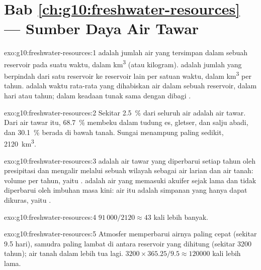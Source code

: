 \section*{Bab \ref{ch:g10:freshwater-resources} --- Sumber Daya Air Tawar}

\begin{solution}{exo:g10:freshwater-resources:1}
 adalah jumlah air yang tersimpan dalam sebuah reservoir pada suatu waktu,
dalam \unit{km^3} (atau kilogram).  adalah jumlah yang berpindah dari satu
reservoir ke reservoir lain per satuan waktu, dalam \unit{km^3} per tahun.
 adalah waktu rata-rata yang dihabiskan air dalam sebuah
reservoir, dalam hari atau tahun; dalam keadaan tunak  sama
dengan  dibagi .
\end{solution}

\begin{solution}{exo:g10:freshwater-resources:2}
Sekitar \qty{2.5}{\percent} dari seluruh air adalah air tawar. Dari air tawar
itu, \qty{68.7}{\percent} membeku dalam tudung es, gletser, dan salju abadi,
dan \qty{30.1}{\percent} berada di bawah tanah. Sungai menampung paling
sedikit, \num{2120}~\unit{km^3}.
\end{solution}

\begin{solution}{exo:g10:freshwater-resources:3}
 adalah air tawar yang diperbarui setiap tahun oleh
presipitasi dan mengalir melalui sebuah wilayah sebagai air larian dan air
tanah: volume per tahun, yaitu .  adalah air yang
memasuki akuifer sejak lama dan tidak diperbarui oleh imbuhan masa kini:
air itu adalah simpanan yang hanya dapat dikuras, yaitu .
\end{solution}

\begin{solution}{exo:g10:freshwater-resources:4}
$91\,000/2120 \approx 43$ kali lebih banyak.
\end{solution}

\begin{solution}{exo:g10:freshwater-resources:5}
Atmosfer memperbarui airnya paling cepat (sekitar \num{9.5} hari), samudra
paling lambat di antara reservoir yang dihitung (sekitar \num{3200} tahun); air
tanah dalam lebih tua lagi. $3200 \times 365.25/9.5 \approx \num{120000}$
kali lebih lama.
\end{solution}

